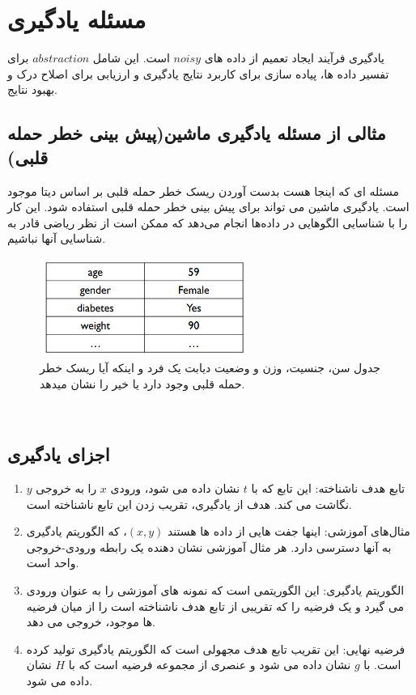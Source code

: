 \documentclass[12pt]{article}
\begin{document}
\fontsize{12pt}{14pt}\selectfont


\section*{مسئله یادگیری}
یادگیری فرآیند ایجاد تعمیم از داده های $noisy$ است. این شامل $abstraction$ برای تفسیر داده ها، پیاده سازی برای کاربرد نتایج یادگیری و ارزیابی برای اصلاح درک و بهبود نتایج.
\\
\subsection*{مثالی از مسئله یادگیری ماشین(پیش بینی خطر حمله قلبی)}
مسئله ای که اینجا هست بدست آوردن ریسک خطر حمله قلبی بر اساس دیتا موجود است. یادگیری ماشین می تواند برای پیش بینی خطر حمله قلبی استفاده شود. این کار را با شناسایی الگوهایی در داده‌ها انجام می‌دهد که ممکن است از نظر ریاضی قادر به شناسایی آنها نباشیم.

\begin{figure}[htbp]
    \centering
    \includegraphics[width=0.6\textwidth]{etc/Images/Fig1.png}
    \caption{جدول سن، جنسیت، وزن و وضعیت دیابت یک فرد و اینکه آیا ریسک خطر حمله قلبی وجود دارد یا خیر را نشان میدهد.}
    \label{Fig1}
\end{figure}
\\

\subsection*{اجزای یادگیری}
\begin{enumerate}
  \item تابع هدف ناشناخته: این تابع که با $t$ نشان داده می شود، ورودی $x$ را به خروجی $y$ نگاشت می کند. هدف از یادگیری، تقریب زدن این تابع ناشناخته است.
  \item مثال‌های آموزشی: اینها جفت هایی از داده‌ ها هستند $(x,y)$، که الگوریتم یادگیری به آنها دسترسی دارد. هر مثال آموزشی نشان دهنده یک رابطه ورودی-خروجی واحد است.
  \item الگوریتم یادگیری: این الگوریتمی است که نمونه های آموزشی را به عنوان ورودی می گیرد و یک فرضیه را که تقریبی از تابع هدف ناشناخته است را از میان فرضیه ها موجود، خروجی می دهد.
  \item فرضیه نهایی: این تقریب تابع هدف مجهولی است که الگوریتم یادگیری تولید کرده است. با $g$ نشان داده می شود و عنصری از مجموعه فرضیه است که با $H$ نشان داده می شود.
\end{enumerate}
\end{document}
